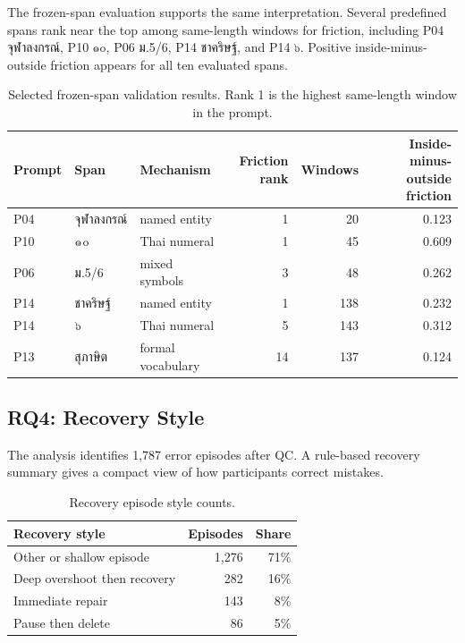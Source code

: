 \documentclass[11pt,a4paper]{article}
\begin{document}
The frozen-span evaluation supports the same interpretation. Several predefined spans rank near the top among same-length windows for friction, including P04 จุฬาลงกรณ์, P10 ๑๐, P06 ม.5/6, P14 ชาคริษฐ์, and P14 ๖. Positive inside-minus-outside friction appears for all ten evaluated spans.

\begin{table}[H]
\centering
\caption{Selected frozen-span validation results. Rank 1 is the highest same-length window in the prompt.}
\label{tab:frozen}
\small
\begin{tabularx}{\linewidth}{l l Y r r r}
\toprule
Prompt & Span & Mechanism & Friction rank & Windows & Inside-minus-outside friction \\
\midrule
P04 & จุฬาลงกรณ์ & named entity & 1 & 20 & 0.123 \\
P10 & ๑๐ & Thai numeral & 1 & 45 & 0.609 \\
P06 & ม.5/6 & mixed symbols & 3 & 48 & 0.262 \\
P14 & ชาคริษฐ์ & named entity & 1 & 138 & 0.232 \\
P14 & ๖ & Thai numeral & 5 & 143 & 0.312 \\
P13 & สุภาษิต & formal vocabulary & 14 & 137 & 0.124 \\
\bottomrule
\end{tabularx}
\end{table}

\subsection{RQ4: Recovery Style}

The analysis identifies 1,787 error episodes after QC. A rule-based recovery summary gives a compact view of how participants correct mistakes.

\begin{table}[H]
\centering
\caption{Recovery episode style counts.}
\label{tab:recovery_counts}
\begin{tabular}{l r r}
\toprule
Recovery style & Episodes & Share \\
\midrule
Other or shallow episode & 1,276 & 71\% \\
Deep overshoot then recovery & 282 & 16\% \\
Immediate repair & 143 & 8\% \\
Pause then delete & 86 & 5\% \\
\bottomrule
\end{tabular}
\end{table}
\end{document}
